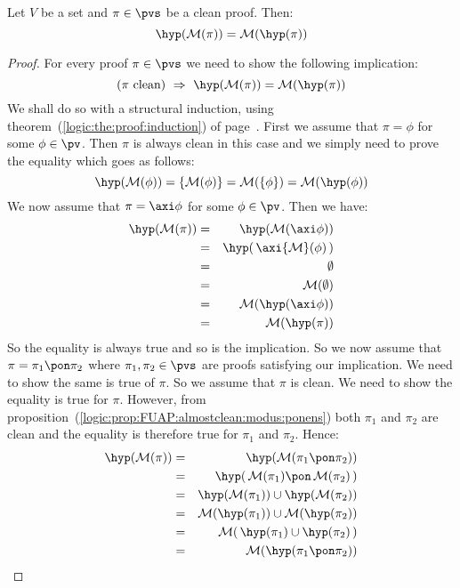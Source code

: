 \begin{prop}\label{logic:prop:FUAP:mintransproof:hypothesis}
Let $V$ be a set and $\pi\in\pvs$ be a clean proof. Then:
    \[
    \hyp({\cal M}(\pi))={\cal M}(\hyp(\pi))
    \]
\end{prop}
\begin{proof}
For every proof $\pi\in\pvs$ we need to show the following
implication:
    \[
    (\mbox{$\pi$ clean})\ \Rightarrow\ \hyp({\cal M}(\pi))={\cal M}(\hyp(\pi))
    \]
We shall do so with a structural induction, using
theorem~(\ref{logic:the:proof:induction}) of
page~\pageref{logic:the:proof:induction}. First we assume that
$\pi=\phi$ for some $\phi\in\pv$. Then $\pi$ is always clean in this
case and we simply need to prove the equality which goes as follows:
    \[
    \hyp({\cal M}(\phi))=\{{\cal M}(\phi)\}={\cal M}(\{\phi\})={\cal M}(\hyp(\phi))
    \]
We now assume that $\pi=\axi\phi$ for some $\phi\in\pv$. Then we
have:
    \begin{eqnarray*}
    \hyp({\cal M}(\pi))&=&\hyp({\cal M}(\axi\phi))\\
    &=&\hyp(\,\axi{\cal M}(\phi)\,)\\
    &=&\emptyset\\
    &=&{\cal M}(\emptyset)\\
    &=&{\cal M}(\hyp(\axi\phi))\\
    &=&{\cal M}(\hyp(\pi))\\
    \end{eqnarray*}
So the equality is always true and so is the implication. So we now
assume that $\pi=\pi_{1}\pon\pi_{2}$ where $\pi_{1},\pi_{2}\in\pvs$
are proofs satisfying our implication. We need to show the same is
true of $\pi$. So we assume that $\pi$ is clean. We need to show the
equality is true for $\pi$. However, from
proposition~(\ref{logic:prop:FUAP:almostclean:modus:ponens}) both
$\pi_{1}$ and $\pi_{2}$ are clean and the equality is therefore true
for $\pi_{1}$ and $\pi_{2}$. Hence:
    \begin{eqnarray*}
    \hyp({\cal M}(\pi))&=&\hyp({\cal M}(\pi_{1}\pon\pi_{2}))\\
    &=&\hyp(\,{\cal M}(\pi_{1})\pon\,{\cal M}(\pi_{2})\,)\\
    &=&\hyp({\cal M}(\pi_{1}))\cup\hyp({\cal M}(\pi_{2}))\\
    &=&{\cal M}(\hyp(\pi_{1}))\cup{\cal M}(\hyp(\pi_{2}))\\
    &=&{\cal M}(\,\hyp(\pi_{1})\cup\hyp(\pi_{2})\,)\\
    &=&{\cal M}(\hyp(\pi_{1}\pon\pi_{2}))\\

\end{eqnarray*}
\end{proof}
